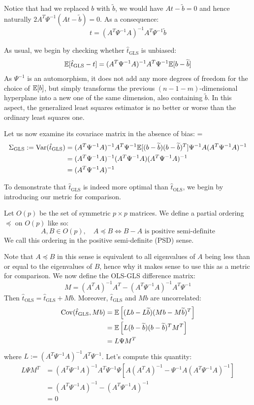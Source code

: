 Notice that had we replaced $b$ with $\widetilde b$, we would have $At-\widetilde b=0$ and hence naturally $2A^T\Psi^{-1}(At-\widetilde b) = 0$. As a consequence:
\[
    t = (A^T\Psi^{-1}A)^{-1}A^T\Psi^{-1}\widetilde b
\]

As usual, we begin by checking whether $\hat t_\text{GLS}$ is unbiased:
\[
    \mathbb E[\hat t_\text{GLS} - t] = (A^T\Psi^{-1}A)^{-1}A^T\Psi^{-1}\mathbb E[b-\widetilde b]
\]
As $\Psi^{-1}$ is an automorphism, it does not add any more degrees of freedom for the choice of $\mathbb E[b]$, but simply transforms the previous $(n-1-m)$-dimensional hyperplane into a new one of the same dimension, also containing $\widetilde b$. In this aspect, the generalized least squares estimator is no better or worse than the ordinary least squares one.

Let us now examine its covariace matrix in the absence of bias:
{\hfuzz=\maxdimen
\begin{align*}
    \Sigma_\text{GLS} := \mathrm{Var}(\hat t_\text{GLS})
    &= (A^T\Psi^{-1}A)^{-1}A^T\Psi^{-1}\mathbb E[(b-\widetilde b)(b-\widetilde b)^T]\Psi^{-1}A(A^T\Psi^{-1}A)^{-1} \\
    &= (A^T\Psi^{-1}A)^{-1}(A^T\Psi^{-1}A)(A^T\Psi^{-1}A)^{-1} \\
    &= (A^T\Psi^{-1}A)^{-1}
\end{align*}
}

To demonstrate that $\hat t_\text{GLS}$ is indeed more optimal than $\hat t_\text{OLS}$, we begin by introducing our metric for comparison.

\begin{Definition}
Let $O(p)$ be the set of symmetric $p\times p$ matrices. We define a partial ordering $\preceq$ on $O(p)$ like so:
\[
    A,B\in O(p), \quad A\preceq B \iff B-A \text{ is positive semi-definite}
\]
We call this ordering in the positive semi-definite (PSD) sense. 
\end{Definition}

Note that $A\preceq B$ in this sense is equivalent to all eigenvalues of $A$ being less than or equal to the eigenvalues of $B$, hence why it makes sense to use this as a metric for comparison. We now define the OLS-GLS difference matrix:
\[
    M = (A^TA)^{-1}A^T - (A^T\Psi^{-1}A)^{-1}A^T\Psi^{-1}
\]
Then $\hat t_\text{OLS} = \hat t_\text{GLS} + Mb$. Moreover, $\hat t_\text{GLS}$ and $Mb$ are uncorrelated:
\begin{align*}
    \mathrm{Cov}(\hat t_\text{GLS}, Mb)
    &= \mathbb E\left[(Lb-L\widetilde b)(Mb-M\widetilde b)^T\right] \\
    &= \mathbb E\left[L(b-\widetilde b)(b-\widetilde b)^TM^T\right] \\
    &= L\Psi M^T
\end{align*}
where $L := (A^T\Psi^{-1}A)^{-1}A^T\Psi^{-1}$. Let's compute this quantity:
\begin{align*}
    L\Psi M^T
    &= (A^T\Psi^{-1}A)^{-1}A^T\Psi^{-1}\Psi\left[A(A^TA)^{-1} - \Psi^{-1}A(A^T\Psi^{-1}A)^{-1} \right] \\
    &= (A^T\Psi^{-1}A)^{-1} - (A^T\Psi^{-1}A)^{-1} \\
    &= 0
\end{align*}

